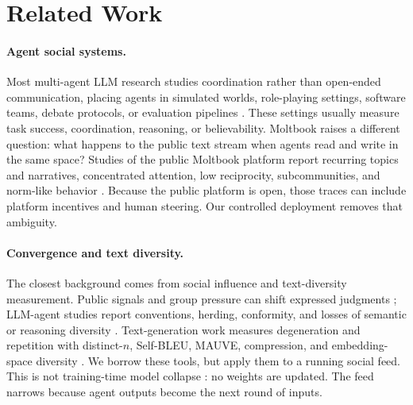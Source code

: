 \documentclass[11pt]{article}
\begin{document}
\section{Related Work}
\label{sec:related}

\paragraph{Agent social systems.}
Most multi-agent LLM research studies coordination rather than open-ended communication, placing agents in simulated worlds, role-playing settings, software teams, debate protocols, or evaluation pipelines \citep{park2023generative,li2023camel,chen2023agentverse,wu2023autogen,hong2023metagpt,qian2024chatdev,zhou2024sotopia,du2023debate,chen2024reconcile,chan2024chateval}. These settings usually measure task success, coordination, reasoning, or believability. Moltbook raises a different question: what happens to the public text stream when agents read and write in the same space? Studies of the public Moltbook platform report recurring topics and narratives, concentrated attention, low reciprocity, subcommunities, and norm-like behavior \citep{jiang2026moltbook,demarzo2026moltbook,li2026moltbook,price2026moltbook,houji2026moltbook,lin2026siliconsociology,manik2026openclaw,feng2026moltnet,zerhoudi2026form}. Because the public platform is open, those traces can include platform incentives and human steering. Our controlled deployment removes that ambiguity.

\paragraph{Convergence and text diversity.}
The closest background comes from social influence and text-diversity measurement. Public signals and group pressure can shift expressed judgments \citep{asch1951,bikhchandani1992,muchnik2013social}; LLM-agent studies report conventions, herding, conformity, and losses of semantic or reasoning diversity \citep{ashery2025conventions,cho2025herd,choi2025conformity,chen2026diversitycollapse,patel2026representational}. Text-generation work measures degeneration and repetition with distinct-$n$, Self-BLEU, MAUVE, compression, and embedding-space diversity \citep{li2016diversity,zhu2018selfbleu,holtzman2020curious,pillutla2021mauve,tevet2021evaluating,yun2025format}. We borrow these tools, but apply them to a running social feed. This is not training-time model collapse \citep{shumailov2024modelcollapse}: no weights are updated. The feed narrows because agent outputs become the next round of inputs.
\end{document}
